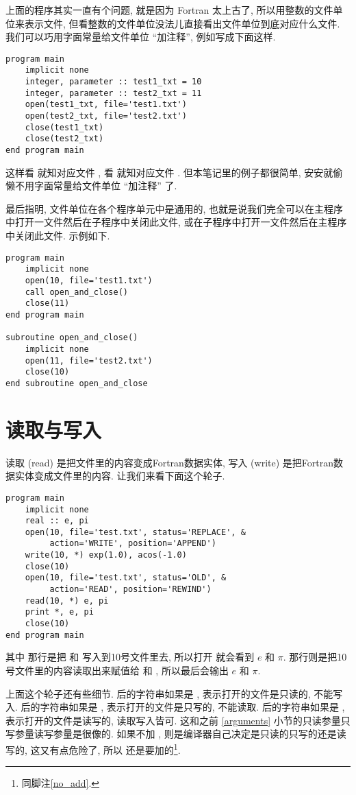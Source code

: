 上面的程序其实一直有个问题, 就是因为 Fortran 太上古了, 所以用整数的文件单位来表示文件, 但看整数的文件单位没法儿直接看出文件单位到底对应什么文件. 我们可以巧用字面常量给文件单位 ``加注释'', 例如写成下面这样.
\begin{lstlisting}
program main
    implicit none
    integer, parameter :: test1_txt = 10
    integer, parameter :: test2_txt = 11
    open(test1_txt, file='test1.txt')
    open(test2_txt, file='test2.txt')
    close(test1_txt)
    close(test2_txt)
end program main
\end{lstlisting}
这样看  就知对应文件 , 看  就知对应文件 . 但本笔记里的例子都很简单, 安安就偷懒不用字面常量给文件单位 ``加注释'' 了.

最后指明, 文件单位在各个程序单元中是通用的, 也就是说我们完全可以在主程序中打开一文件然后在子程序中关闭此文件, 或在子程序中打开一文件然后在主程序中关闭此文件. 示例如下.
\begin{lstlisting}
program main
    implicit none
    open(10, file='test1.txt')
    call open_and_close()
    close(11)
end program main

subroutine open_and_close()
    implicit none
    open(11, file='test2.txt')
    close(10)
end subroutine open_and_close
\end{lstlisting}

\section{读取与写入}

读取 (read) 是把文件里的内容变成Fortran数据实体, 写入 (write) 是把Fortran数据实体变成文件里的内容. 让我们来看下面这个轮子. 
\begin{lstlisting}
program main
    implicit none
    real :: e, pi
    open(10, file='test.txt', status='REPLACE', &
         action='WRITE', position='APPEND')
    write(10, *) exp(1.0), acos(-1.0)
    close(10)
    open(10, file='test.txt', status='OLD', &
         action='READ', position='REWIND')
    read(10, *) e, pi
    print *, e, pi
    close(10)
end program main
\end{lstlisting}
其中  那行是把  和  写入到10号文件里去, 所以打开  就会看到 $ e $ 和 $ \pi $.   那行则是把10号文件里的内容读取出来赋值给 和 , 所以最后会输出 $ e $ 和 $ \pi $. 

上面这个轮子还有些细节.   后的字符串如果是 , 表示打开的文件是只读的, 不能写入.   后的字符串如果是 , 表示打开的文件是只写的, 不能读取.   后的字符串如果是 , 表示打开的文件是读写的, 读取写入皆可. 这和之前 \ref{arguments} 小节的只读参量只写参量读写参量是很像的. 如果不加 , 则是编译器自己决定是只读的只写的还是读写的, 这又有点危险了, 所以  还是要加的\footnote{同脚注\ref{no_add}.}. 

